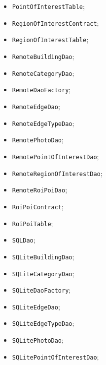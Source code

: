 \documentclass[../DefinizioneDiProdotto.tex]{subfiles}
\begin{document}
\begin{itemize}
\begin{itemize}
		\item \texttt{PointOfInterestTable};
		
		\item \texttt{RegionOfInterestContract};
		
		\item \texttt{RegionOfInterestTable};
		
		\item \texttt{RemoteBuildingDao};
		
		\item \texttt{RemoteCategoryDao};
		
		\item \texttt{RemoteDaoFactory};
		
		\item \texttt{RemoteEdgeDao};
		
		\item \texttt{RemoteEdgeTypeDao};
		
		\item \texttt{RemotePhotoDao};
		
		\item \texttt{RemotePointOfInterestDao};
		
		\item \texttt{RemoteRegionOfInterestDao};
		
		\item \texttt{RemoteRoiPoiDao};
		
		\item \texttt{RoiPoiContract};
		
		\item \texttt{RoiPoiTable};
		
		\item \texttt{SQLDao};
		
		\item \texttt{SQLiteBuildingDao};
		
		\item \texttt{SQLiteCategoryDao};
		
		\item \texttt{SQLiteDaoFactory};
		
		\item \texttt{SQLiteEdgeDao};
		
		\item \texttt{SQLiteEdgeTypeDao};
		
		\item \texttt{SQLitePhotoDao};
		
		\item \texttt{SQLitePointOfInterestDao};
		

\end{itemize}
\end{itemize}
\end{document}
